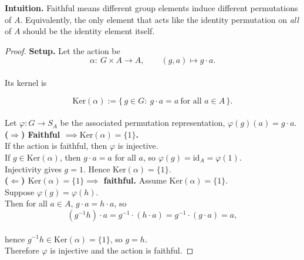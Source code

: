 \documentclass[12pt]{article}
\theoremstyle{definition}
\begin{document}
\dotfill

\noindent\textbf{Intuition.}
Faithful means different group elements induce different permutations of $A$.
Equivalently, the only element that acts like the identity permutation on \emph{all} of $A$
should be the identity element itself.

\dotfill

\begin{proof}
\noindent\textbf{Setup.} Let the action be
\[
\alpha:\ G\times A \longrightarrow A,\qquad (g,a)\longmapsto g\cdot a.
\]\\

Its kernel is

\[
\mathrm{Ker}(\alpha):=\{\,g\in G:\ g\cdot a=a\ \text{for all }a\in A\,\}.
\]\\

Let $\varphi:G\to S_A$ be the associated permutation representation, $\varphi(g)(a)=g\cdot a$.\\

\noindent\textbf{($\Rightarrow$) Faithful $\implies \mathrm{Ker}(\alpha)=\{1\}$.}\\

\noindent
If the action is faithful, then $\varphi$ is injective.\\

\noindent
If $g\in \mathrm{Ker}(\alpha)$, then $g\cdot a=a$ for all $a$, so $\varphi(g)=\mathrm{id}_A=\varphi(1)$.\\

\noindent Injectivity gives $g=1$. Hence $\mathrm{Ker}(\alpha)=\{1\}$.\\

\noindent\textbf{($\Leftarrow$) $\mathrm{Ker}(\alpha)=\{1\}\implies$ faithful.}
Assume $\mathrm{Ker}(\alpha)=\{1\}$. \\


\noindent Suppose $\varphi(g)=\varphi(h)$.\\

\noindent Then for all $a\in A$, $g\cdot a=h\cdot a$, so\\

\[
(g^{-1}h)\cdot a = g^{-1}\cdot (h\cdot a)=g^{-1}\cdot(g\cdot a)=a,
\]\\

hence $g^{-1}h\in \mathrm{Ker}(\alpha)=\{1\}$, so $g=h$.\\

\noindent Therefore $\varphi$ is injective and the action is faithful.

\end{proof}
\end{document}
